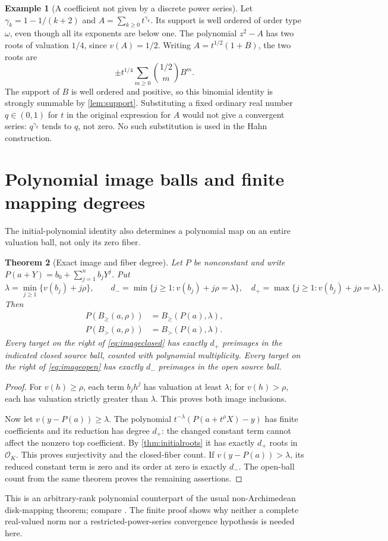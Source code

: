 \documentclass[11pt,letterpaper]{article}
\numberwithin{equation}{section}
\newtheorem{theorem}{Theorem}[section]
\theoremstyle{definition}
\newtheorem{example}[theorem]{Example}
\theoremstyle{remark}\newtheorem{remark}[theorem]{Remark}
\newcommand{\OO}{\mathcal O}
\newcommand{\Bge}[2]{B_{\ge}(#1,#2)}
\newcommand{\Bgt}[2]{B_{>}(#1,#2)}
\begin{document}
\begin{example}[A coefficient not given by a discrete power series]
Let $\gamma_k=1-1/(k+2)$ and
$A=\sum_{k\ge0}t^{\gamma_k}$. Its support is well ordered of order type
$\omega$, even though all its exponents are below one. The polynomial
$z^2-A$ has two roots of valuation $1/4$, since $v(A)=1/2$.
Writing $A=t^{1/2}(1+B)$, the two roots are
\[
 \pm t^{1/4}\sum_{m\ge0}\binom{1/2}{m}B^m.
\]
The support of $B$ is well ordered and positive, so this binomial
identity is strongly summable by \cref{lem:support}. Substituting a fixed
ordinary real number $q\in(0,1)$ for $t$ in the original expression for
$A$ would not give a convergent series: $q^{\gamma_k}$ tends to $q$,
not zero. No such substitution is used in the Hahn construction.
\end{example}

\section{Polynomial image balls and finite mapping degrees}\label{sec:images}
The initial-polynomial identity also determines a polynomial map on
an entire valuation ball, not only its zero fiber.

\begin{theorem}[Exact image and fiber degree]\label{thm:imageballs}
Let $P$ be nonconstant and write
$P(a+Y)=b_0+\sum_{j=1}^nb_jY^j$. Put
\[
 \lambda=\min_{j\ge1}\{v(b_j)+j\rho\},\qquad
 d_-=\min\{j\ge1:v(b_j)+j\rho=\lambda\},\quad
 d_+=\max\{j\ge1:v(b_j)+j\rho=\lambda\}.
\]
Then
\begin{align}
 P(\Bge a\rho)&=\Bge{P(a)}{\lambda},\label{eq:imageclosed}\\
 P(\Bgt a\rho)&=\Bgt{P(a)}{\lambda}.\label{eq:imageopen}
\end{align}
Every target on the right of \eqref{eq:imageclosed} has exactly $d_+$
preimages in the indicated closed source ball, counted with polynomial
multiplicity. Every target on the right of \eqref{eq:imageopen} has
exactly $d_-$ preimages in the open source ball.
\end{theorem}
\begin{proof}
For $v(h)\ge\rho$, each term $b_jh^j$ has valuation at least $\lambda$;
for $v(h)>\rho$, each has valuation strictly greater than $\lambda$.
This proves both image inclusions.

Now let $v(y-P(a))\ge\lambda$. The polynomial
$t^{-\lambda}(P(a+t^\rho X)-y)$ has finite coefficients and its
reduction has degree $d_+$: the changed constant term cannot affect
the nonzero top coefficient. By \cref{thm:initialroots} it has exactly
$d_+$ roots in $\OO_K$. This proves surjectivity and the closed-fiber
count. If $v(y-P(a))>\lambda$, its reduced constant term is zero and
its order at zero is exactly $d_-$. The open-ball count from the same
theorem proves the remaining assertions.
\end{proof}
This is an arbitrary-rank polynomial counterpart of the usual
non-Archimedean disk-mapping theorem; compare
\cite[Corollary 3.11]{Benedetto}. The finite proof shows why neither a
complete real-valued norm nor a restricted-power-series convergence
hypothesis is needed here.
\end{document}
